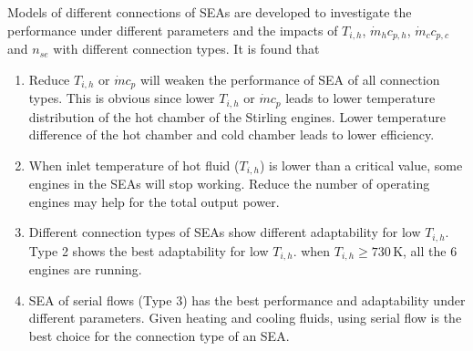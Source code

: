Models of different connections of SEAs are developed to investigate the performance under different parameters and the impacts of $T_{i,h}$, $\dot{m}_hc_{p,h}$, $\dot{m}_cc_{p,c}$ and $n_{se}$ with different connection types. It is found that

\begin{enumerate}[label=(\arabic*)]
\item Reduce $T_{i,h}$ or $\dot{m}c_{p}$ will weaken the performance of SEA of all connection types. This is obvious since lower $T_{i,h}$ or $\dot{m}c_p$ leads to lower temperature distribution of the hot chamber of the Stirling engines. Lower temperature difference of the hot chamber and cold chamber leads to lower efficiency.
\item When inlet temperature of hot fluid ($T_{i,h}$) is lower than a critical value, some engines in the SEAs will stop working. Reduce the number of operating engines may help for the total output power.
\item Different connection types of SEAs show different adaptability for low $T_{i,h}$. Type 2 shows the best adaptability for low $T_{i,h}$. when $T_{i,h} \geqslant 730\,\mathrm{K}$, all the 6 engines are running.
\item SEA of serial flows (Type 3) has the best performance and adaptability under different parameters. Given heating and cooling fluids, using serial flow is the best choice for the connection type of an SEA.
	
\end{enumerate}
